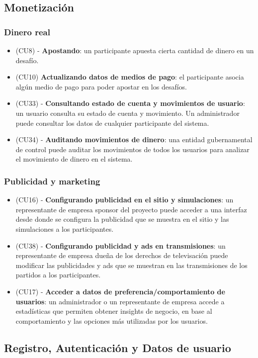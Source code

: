 \subsection{Monetización}
\subsubsection{Dinero real}
\begin{itemize}
\item (CU8) - \textbf{Apostando}: un participante apuesta cierta cantidad de dinero en un desafío.
\item (CU10) \textbf{Actualizando datos de medios de pago}: el participante asocia algún medio de pago para poder apostar en los desafíos.
\item (CU33) - \textbf{Consultando estado de cuenta y movimientos de usuario}: un usuario consulta su estado de cuenta y movimiento. Un administrador puede consultar los datos de cualquier participante del sistema.
\item (CU34) - \textbf{Auditando movimientos de dinero}: una entidad gubernamental de control puede auditar los movimientos de todos los usuarios para analizar el movimiento de dinero en el sistema.
\end{itemize}

\subsubsection{Publicidad y marketing}
\begin{itemize}
\item (CU16) - \textbf{Configurando publicidad en el sitio y simulaciones}: un representante de empresa sponsor del proyecto puede acceder a una interfaz desde donde se configura la publicidad que se muestra en el sitio y las simulaciones a los participantes.
\item (CU38) - \textbf{Configurando publicidad y ads en transmisiones}: un representante de empresa dueña de los derechos de televisación puede modificar las publicidades y ads que se muestran en las transmisiones de los partidos a los participantes.
\item (CU17) - \textbf{Acceder a datos de preferencia/comportamiento de usuarios}: un administrador o un representante de empresa accede a estadísticas que permiten obtener insights de negocio, en base al comportamiento y las opciones más utilizadas por los usuarios.
\end{itemize}

\subsection{Registro, Autenticación y Datos de usuario}

